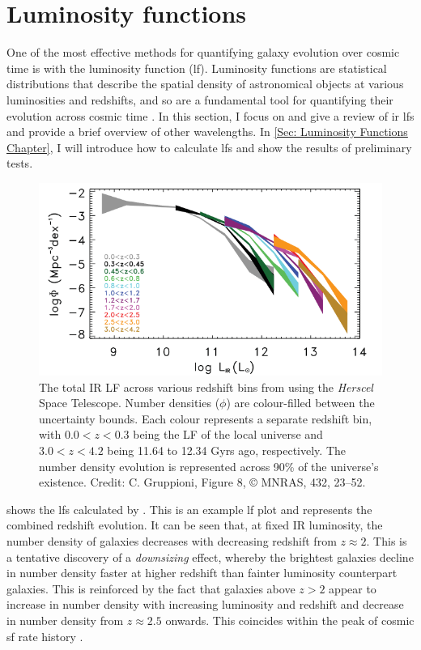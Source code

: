 \newpage

\section{Luminosity functions}
One of the most effective methods for quantifying galaxy evolution over cosmic time is with the luminosity function (\gls{lf}). Luminosity functions are statistical distributions that describe the spatial density of astronomical objects at various luminosities and redshifts, and so are a fundamental tool for quantifying their evolution across cosmic time \citep{han_evolution_2012, dai_mid-infrared_2009, wylezalek_galaxy_2014}. In this section, I focus on and give a review of \gls{ir} \gls{lf}s and provide a brief overview of other wavelengths. In \cref{Sec: Luminosity Functions Chapter}, I will introduce how to calculate \gls{lf}s and show the results of preliminary tests. 

\begin{figure}[h!]
    \centering
    \includegraphics[width=\linewidth]{Figures/grupp_LF.png}
    \caption{The total IR LF across various redshift bins from \cite{gruppioni_herschel_2013} using the \textit{Herscel} Space Telescope. Number densities ($\phi$) are colour-filled between the uncertainty bounds. Each colour represents a separate redshift bin, with $0.0<z<0.3$ being the LF of the local universe and $3.0<z<4.2$ being 11.64 to 12.34 Gyrs ago, respectively. The number density evolution is represented across 90\% of the universe's existence. Credit: C. Gruppioni, Figure 8, © MNRAS, 432, 23–52.}
    \label{Fig: Example LF Gruppioni}
\end{figure}

 shows the \gls{lf}s calculated by \citep{gruppioni_herschel_2013}. This is an example \gls{lf} plot and represents the combined redshift evolution. It can be seen that, at fixed IR luminosity, the number density of galaxies decreases with decreasing redshift from $z\approx 2$. This is a tentative discovery of a \textit{downsizing} effect, whereby the brightest galaxies decline in number density faster at higher redshift than fainter luminosity counterpart galaxies. This is reinforced by the fact that galaxies above $z>2$ appear to increase in number density with increasing luminosity and redshift and decrease in number density from $z\approx2.5$ onwards. This coincides within the peak of cosmic \gls{sf} rate history \citep{madau_cosmic_2014}.

